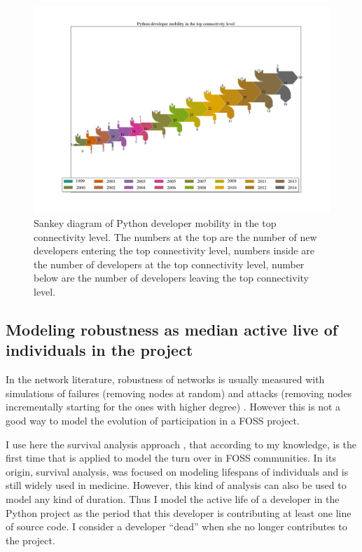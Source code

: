 \begin{landscape}
\begin{figure}[p]
\begin{center}
\includegraphics[scale=0.42]{figures/sankey_mobility_python_years}
\caption[Sankey diagram of Python developer mobility in the top connectivity level.]{Sankey diagram of Python developer mobility in the top connectivity level. The numbers at the top are the number of new developers entering the top connectivity level, numbers inside are the number of developers at the top connectivity level, number below are the number of developers leaving the top connectivity level.}
\label{fig:sankey}
\end{center}
\end{figure}
\end{landscape}


\subsection{Modeling robustness as median active live of individuals in the project}

In the network literature, robustness of networks is usually measured with simulations of failures (removing nodes at random) and attacks (removing nodes incrementally starting for the ones with higher degree) \citep{albert:2000}. However this is not a good way to model the evolution of participation in a FOSS project.

I use here the survival analysis approach \citep{miller:2011}, that according to my knowledge, is the first time that is applied to model the turn over in FOSS communities. In its origin, survival analysis, was focused on modeling lifespans of individuals and is still widely used in medicine. However, this kind of analysis can also be used to model any kind of duration. Thus I model the active life of a developer in the Python project as the period that this developer is contributing at least one line of source code. I consider a developer ``dead'' when she no longer contributes to the project.

